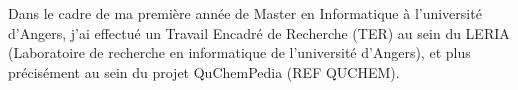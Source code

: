 
\par Dans le cadre de ma première année de Master en Informatique à l'université d'Angers, j'ai effectué un Travail Encadré de Recherche (TER) au sein du LERIA (Laboratoire de recherche en informatique de l'université d'Angers), et plus précisément au sein du projet QuChemPedia (REF QUCHEM). 